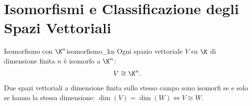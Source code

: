 \section{Isomorfismi e Classificazione degli Spazi Vettoriali}
\begin{teorema}{Isomorfismo con $\K^n$}{isomorfismo_kn}
Ogni spazio vettoriale $V$ su $\K$ di dimensione finita $n$ è isomorfo a $\K^n$:
\begin{equation}
    V \cong \K^n.
\end{equation}
Due spazi vettoriali a dimensione finita sullo stesso campo sono isomorfi se e solo se hanno la stessa dimensione: $\dim(V) = \dim(W) \iff V \cong W$.
\end{teorema}
